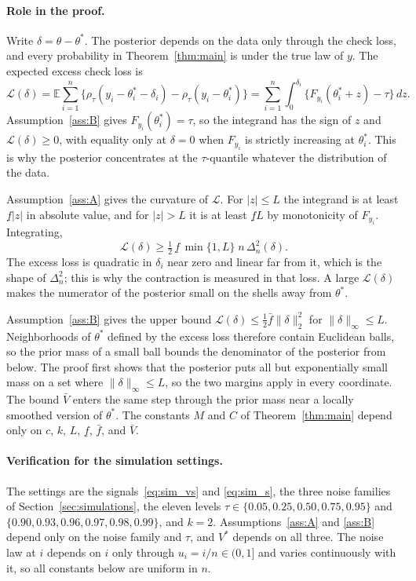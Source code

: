 \paragraph{Role in the proof.}
Write $\delta=\theta-\theta^*$. The posterior depends on the data only through the check loss, and every probability in Theorem~\ref{thm:main} is under the true law of $y$. The expected excess check loss is
\[
\mathcal{L}(\delta)=\mathbb{E}\sum_{i=1}^n\bigl\{\rho_\tau(y_i-\theta^*_i-\delta_i)-\rho_\tau(y_i-\theta^*_i)\bigr\}=\sum_{i=1}^n\int_0^{\delta_i}\bigl\{F_{y_i}(\theta^*_i+z)-\tau\bigr\}\,dz .
\]
Assumption~\ref{ass:B} gives $F_{y_i}(\theta^*_i)=\tau$, so the integrand has the sign of $z$ and $\mathcal{L}(\delta)\ge0$, with equality only at $\delta=0$ when $F_{y_i}$ is strictly increasing at $\theta^*_i$. This is why the posterior concentrates at the $\tau$-quantile whatever the distribution of the data.

Assumption~\ref{ass:A} gives the curvature of $\mathcal{L}$. For $|z|\le L$ the integrand is at least $\underline f|z|$ in absolute value, and for $|z|>L$ it is at least $\underline f L$ by monotonicity of $F_{y_i}$. Integrating,
\[
\mathcal{L}(\delta)\ge\tfrac12\,\underline f\,\min\{1,L\}\;n\,\Delta_n^2(\delta).
\]
The excess loss is quadratic in $\delta_i$ near zero and linear far from it, which is the shape of $\Delta_n^2$; this is why the contraction is measured in that loss. A large $\mathcal{L}(\delta)$ makes the numerator of the posterior small on the shells away from $\theta^*$.

Assumption~\ref{ass:B} gives the upper bound $\mathcal{L}(\delta)\le\tfrac12\bar f\|\delta\|_2^2$ for $\|\delta\|_\infty\le L$. Neighborhoods of $\theta^*$ defined by the excess loss therefore contain Euclidean balls, so the prior mass of a small ball bounds the denominator of the posterior from below. The proof first shows that the posterior puts all but exponentially small mass on a set where $\|\delta\|_\infty\le L$, so the two margins apply in every coordinate. The bound $\bar V$ enters the same step through the prior mass near a locally smoothed version of $\theta^*$. The constants $M$ and $C$ of Theorem~\ref{thm:main} depend only on $c$, $k$, $L$, $\underline f$, $\bar f$, and $\bar V$.

\paragraph{Verification for the simulation settings.}
The settings are the signals~\eqref{eq:sim_vs} and \eqref{eq:sim_s}, the three noise families of Section~\ref{sec:simulations}, the eleven levels $\tau\in\{0.05,0.25,0.50,0.75,0.95\}$ and $\{0.90,0.93,0.96,0.97,0.98,0.99\}$, and $k=2$. Assumptions~\ref{ass:A} and \ref{ass:B} depend only on the noise family and $\tau$, and $V^*$ depends on all three. The noise law at $i$ depends on $i$ only through $u_i=i/n\in(0,1]$ and varies continuously with it, so all constants below are uniform in $n$.

